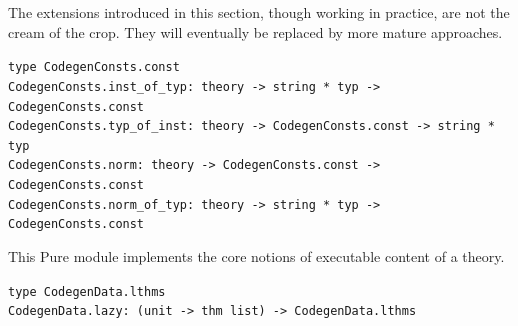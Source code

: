 \begin{isabellebody}
{}
\isamarkuptrue%
%
\begin{isamarkuptext}%
\begin{warn}
    The extensions introduced in this section, though working
    in practice, are not the cream of the crop.  They will
    eventually be replaced by more mature approaches.
  \end{warn}%
\end{isamarkuptext}%
\isamarkuptrue%
%
\isamarkuptrue%
%
\isamarkuptrue%
%
\isadelimmlref
%
\endisadelimmlref
%
\isatagmlref
%
\begin{isamarkuptext}%
\begin{mldecls}
  \verb|type CodegenConsts.const| \\
  \verb|CodegenConsts.inst_of_typ: theory -> string * typ -> CodegenConsts.const| \\
  \verb|CodegenConsts.typ_of_inst: theory -> CodegenConsts.const -> string * typ| \\
  \verb|CodegenConsts.norm: theory -> CodegenConsts.const -> CodegenConsts.const| \\
  \verb|CodegenConsts.norm_of_typ: theory -> string * typ -> CodegenConsts.const|
  \end{mldecls}%
\end{isamarkuptext}%
\isamarkuptrue%
%
\endisatagmlref
{\isafoldmlref}%
%
\isadelimmlref
%
\endisadelimmlref
%
\isamarkuptrue%
%
\begin{isamarkuptext}%
This Pure module implements the core notions of
  executable content of a theory.%
\end{isamarkuptext}%
\isamarkuptrue%
%
\isamarkuptrue%
%
\isadelimmlref
%
\endisadelimmlref
%
\isatagmlref
%
\begin{isamarkuptext}%
\begin{mldecls}
  \verb|type CodegenData.lthms| \\
  \verb|CodegenData.lazy: (unit -> thm list) -> CodegenData.lthms|
  \end{mldecls}%
\end{isamarkuptext}%
\isamarkuptrue%
%
\endisatagmlref
{\isafoldmlref}%
%

\end{isabellebody}
